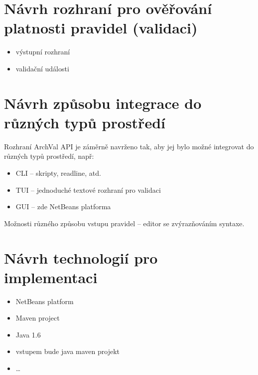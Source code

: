 \section{Návrh rozhraní pro ověřování platnosti pravidel (validaci)}
\begin{itemize}
\item výstupní rozhraní
\item validační události
\end{itemize}

\section{Návrh způsobu integrace do různých typů prostředí}
Rozhraní ArchVal API je záměrně navrženo tak, aby jej bylo možné integrovat do různých typů prostředí, např:

\begin{itemize}
\item CLI -- skripty, readline, atd.
\item TUI -- jednoduché textové rozhraní pro validaci
\item GUI -- zde NetBeans platforma
\end{itemize}

Možnosti různého způsobu vstupu pravidel -- editor se zvýrazňováním syntaxe.

\section{Návrh technologií pro implementaci}
\begin{itemize}
\item NetBeans platform
\item Maven project
\item Java 1.6
\item vstupem bude java maven projekt
\item \ldots
\end{itemize}
